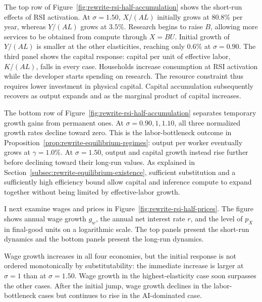 
The top row of Figure~\ref{fig:rewrite-rsi-half-accumulation} shows the short-run effects of RSI activation. At $\sigma=1.50$, $X/(AL)$ initially grows at $80.8\%$ per year, whereas $Y/(AL)$ grows at $3.5\%$. Research begins to raise $B$, allowing more services to be obtained from compute through $X=BU$. %
Initial growth of $Y/(AL)$ is smaller at the other elasticities, reaching only $0.6\%$ at $\sigma=0.90$. The third panel shows the capital response: capital per unit of effective labor, $K/(AL)$, falls in every case. Households increase consumption at RSI activation while the developer starts spending on research. The resource constraint thus requires lower investment in physical capital. Capital accumulation
subsequently recovers as output expands and as the marginal product of capital increases.

The bottom row of Figure~\ref{fig:rewrite-rsi-half-accumulation} separates temporary growth gains from permanent ones. At $\sigma=0.90,1,1.10$, all three normalized growth rates decline
toward zero. This is the labor-bottleneck outcome in
Proposition~\ref{prop:rewrite-equilibrium-regimes}: output per worker eventually grows at $\gamma=1.0\%$. At $\sigma=1.50$, output and capital
growth instead rise further before declining toward their long-run values.
As explained in Section~\ref{subsec:rewrite-equilibrium-existence},
sufficient substitution and a sufficiently high efficiency bound allow
capital and inference compute to expand together without being limited
by effective-labor growth. %

I next examine wages and prices in Figure~\ref{fig:rewrite-rsi-half-prices}. The figure shows annual wage growth $g_w$, the annual net interest rate $r$, and the level of $p_X$ in final-good units on a logarithmic scale. The top panels present the short-run dynamics and the bottom panels present the long-run dynamics.

Wage growth increases in all four economies, but the initial response is not ordered monotonically by substitutability: the immediate increase is larger at $\sigma=1$ than at $\sigma=1.50$. Wage growth in the highest-elasticity case soon surpasses the other cases. After the initial jump, wage growth declines in the labor-bottleneck cases but continues to rise in the AI-dominated case.

